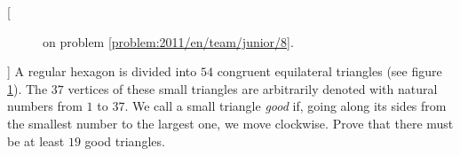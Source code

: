 [{\begin{figure}
\centering
\caption{on problem \ref{problem:2011/en/team/junior/8}.}
\label{fig:problem:2011/en/team/junior/8}
\end{figure}}]%
\label{problem:2011/en/team/junior/8}%
A regular hexagon is divided into $54$ congruent equilateral triangles
(see figure \ref{fig:problem:2011/en/team/junior/8}).
The $37$ vertices of these small triangles are arbitrarily denoted with natural
numbers from $1$ to $37$.
We call a small triangle \emph{good} if, going along its sides from the
smallest number to the largest one, we move clockwise.
Prove that there must be at least $19$ good triangles.

\solution


